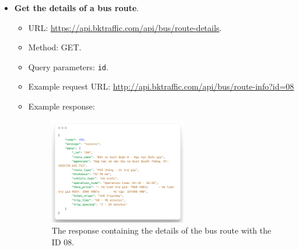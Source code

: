 \begin{itemize}
    \item \textbf{Get the details of a bus route}.
    \begin{itemize}
        \item URL: \url{https://api.bktraffic.com/api/bus/route-details}.
        \item Method: GET.
        \item Query parameters: \lstinline{id}.
        \item Example request URL: \url{http://api.bktraffic.com/api/bus/route-info?id=08}
        \item Example response:
        \begin{figure}[H]
            \centering
            \includegraphics[width=0.6\textwidth]{assets/images/Implementation/route_details_response.png}
            \caption{The response containing the details of the bus route with the ID 08.}
            \label{fig:route_details_response}
        \end{figure}
    \end{itemize}


\end{itemize}
